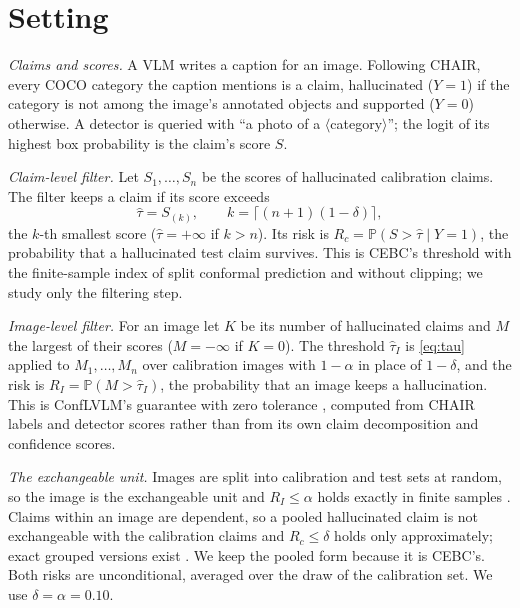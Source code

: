 \documentclass[journal]{IEEEtran}
\theoremstyle{remark}\newtheorem{remark}{Remark}
\renewcommand{\Pr}{\mathbb{P}}
\begin{document}
\section{Setting}\label{sec:setting}
\emph{Claims and scores.} A VLM writes a caption for an image. Following CHAIR, every COCO category the caption mentions is a claim, hallucinated ($Y=1$) if the category is not among the image's annotated objects and supported ($Y=0$) otherwise. A detector is queried with ``a photo of a $\langle$category$\rangle$''; the logit of its highest box probability is the claim's score $S$.

\emph{Claim-level filter.} Let $S_1,\dots,S_n$ be the scores of hallucinated calibration claims. The filter keeps a claim if its score exceeds
\begin{equation}\label{eq:tau}
\hat\tau=S_{(k)},\qquad k=\lceil (n+1)(1-\delta)\rceil ,
\end{equation}
the $k$-th smallest score ($\hat\tau=+\infty$ if $k>n$). Its risk is $R_c=\Pr(S>\hat\tau\mid Y=1)$, the probability that a hallucinated test claim survives. This is CEBC's threshold \cite{cebc} with the finite-sample index of split conformal prediction and without clipping; we study only the filtering step.

\emph{Image-level filter.} For an image let $K$ be its number of hallucinated claims and $M$ the largest of their scores ($M=-\infty$ if $K=0$). The threshold $\hat\tau_I$ is \eqref{eq:tau} applied to $M_1,\dots,M_n$ over calibration images with $1-\alpha$ in place of $1-\delta$, and the risk is $R_I=\Pr(M>\hat\tau_I)$, the probability that an image keeps a hallucination. This is ConfLVLM's guarantee with zero tolerance \cite{conflvlm}, computed from CHAIR labels and detector scores rather than from its own claim decomposition and confidence scores.

\emph{The exchangeable unit.} Images are split into calibration and test sets at random, so the image is the exchangeable unit and $R_I\le\alpha$ holds exactly in finite samples \cite{vovk2005algorithmic}. Claims within an image are dependent, so a pooled hallucinated claim is not exchangeable with the calibration claims and $R_c\le\delta$ holds only approximately; exact grouped versions exist \cite{dunn2023hierarchical,lee2026hierarchical}. We keep the pooled form because it is CEBC's. Both risks are unconditional, averaged over the draw of the calibration set. We use $\delta=\alpha=0.10$.
\end{document}
